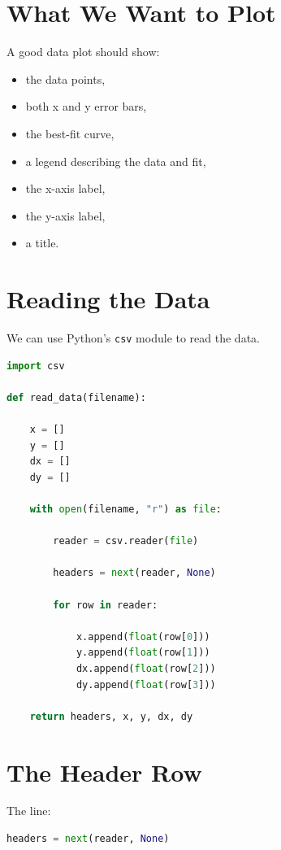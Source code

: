 \documentclass[11pt]{article}
\begin{document}
\section{What We Want to Plot}

A good data plot should show:

\begin{itemize}
    \item the data points,
    \item both x and y error bars,
    \item the best-fit curve,
    \item a legend describing the data and fit,
    \item the x-axis label,
    \item the y-axis label,
    \item a title.
\end{itemize}

\section{Reading the Data}

We can use Python's \texttt{csv} module to read the data.

\begin{lstlisting}[language=Python]
import csv

def read_data(filename):

    x = []
    y = []
    dx = []
    dy = []

    with open(filename, "r") as file:

        reader = csv.reader(file)

        headers = next(reader, None)

        for row in reader:

            x.append(float(row[0]))
            y.append(float(row[1]))
            dx.append(float(row[2]))
            dy.append(float(row[3]))

    return headers, x, y, dx, dy
\end{lstlisting}

\section{The Header Row}

The line:

\begin{lstlisting}[language=Python]
headers = next(reader, None)
\end{lstlisting}
\end{document}
